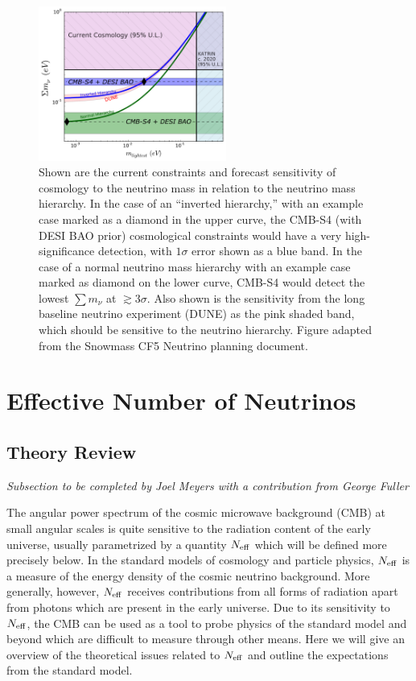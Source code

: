  \begin{figure}[ht]
\centering \includegraphics[width=0.55\textwidth]{Neutrinos/numass_combine_dune}
\caption{Shown are the current constraints and forecast sensitivity of
  cosmology to the neutrino mass in relation to the neutrino mass
  hierarchy.  In the case of an ``inverted hierarchy,'' with an
  example case marked as a diamond in the upper curve, the CMB-S4 (with DESI BAO prior)
  cosmological constraints would have a very high-significance
  detection, with $1\sigma$ error shown as a blue band.  In the case
  of a normal neutrino mass hierarchy with an example case marked as
  diamond on the lower curve, CMB-S4 would detect the lowest
  $\sum m_\nu$ at $\gtrsim 3 \sigma$. Also shown is the
  sensitivity from the long baseline neutrino experiment (DUNE) as the
  pink shaded band, which should be sensitive to the neutrino
  hierarchy. Figure adapted from the Snowmass CF5 Neutrino planning document.
 }
\label{fig:neutrino-noose}
\end{figure}



\section{Effective Number of Neutrinos}

\subsection{Theory Review}

{\it Subsection to be completed by Joel Meyers with a contribution from George Fuller}

The angular power spectrum of the cosmic microwave background (CMB) at small angular scales is quite sensitive to the radiation content of the early universe, usually parametrized by a quantity $N_{\rm eff}$ which will be defined more precisely below.  In the standard models of cosmology and particle physics, $N_{\rm eff}$ is a measure of the energy density of the cosmic neutrino background.  More generally, however, $N_{\rm eff}$ receives contributions from all forms of radiation apart from photons which are present in the early universe.  Due to its sensitivity to $N_{\rm eff}$, the CMB can be used as a tool to probe physics of the standard model and beyond which are difficult to measure through other means.  Here we will give an overview of the theoretical issues related to $N_{\rm eff}$ and outline the expectations from the standard model.

